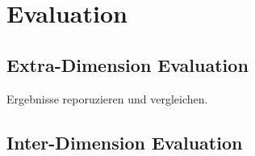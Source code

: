 \section{Evaluation}
\subsection{Extra-Dimension Evaluation}
Ergebnisse reporuzieren und vergleichen.
\subsection{Inter-Dimension Evaluation}
